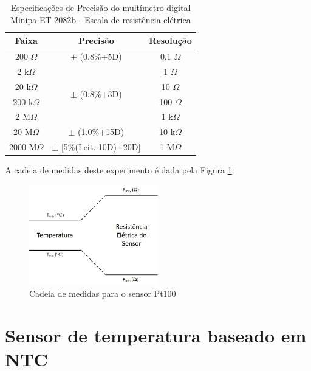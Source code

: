 \documentclass[a4paper]{instrumentacao}
\begin{document}
\begin{table}[H]
\centering
\caption{Especificações de Precisão do multímetro digital Minipa ET-2082b - Escala de resistência elétrica}
\label{tab:precisao-multimetro}
\begin{tabular}{|c|c|c|}
\hline
\textbf{Faixa} & \textbf{Precisão}                 & \textbf{Resolução} \\ \hline
200 $\Omega$           & $\pm$ (0.8\%+5D)                  & 0.1 $\Omega$                 \\ \hline
2 k$\Omega$             & \multirow{4}{*}{$\pm$ (0.8\%+3D)} & 1 $\Omega$                   \\ \cline{1-1} \cline{3-3} 
20 k$\Omega$            &                                   & 10 $\Omega$                  \\ \cline{1-1} \cline{3-3} 
200 k$\Omega$           &                                   & 100 $\Omega$                 \\ \cline{1-1} \cline{3-3} 
2 M$\Omega$             &                                   & 1 k$\Omega$                 \\ \hline
20 M$\Omega$            & $\pm$ (1.0\%+15D)                 & 10 k$\Omega$                \\ \hline
2000 M$\Omega$          & $\pm$ {[}5\%(Leit.-10D)+20D{]}    & 1 M$\Omega$                 \\ \hline
\end{tabular}
\end{table}

A cadeia de medidas deste experimento é dada pela Figura \ref{fig:pt100-cadeia-medidas}:

\begin{figure}[H]
\center
\includegraphics[width=0.5\textwidth]{cadeia_medidas_pt100.jpg}
\caption{Cadeia de medidas para o sensor Pt100}
\label{fig:pt100-cadeia-medidas}
\end{figure}


\section{Sensor de temperatura baseado em NTC}
\label{ch:ntc}
\end{document}
